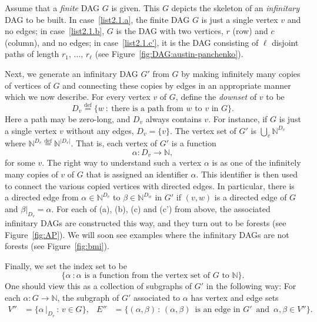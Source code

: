 \documentclass[AHL,Unicode,longabstracts,published]{cedram}
\newcommand{\alf}{\alpha}%
\newcommand*{\defeq}{\stackrel{\mathrm{def}}{=}}
\newcommand*\N{\mathbb{N}}
\newcommand*\N{\mathbb{N}}
\begin{document}
Assume that a \emph{finite} DAG $G$ is given. This $G$ depicts the skeleton of an \emph{infinitary} DAG to be built. In case~\eqref{list2.1.a}, the finite DAG $G$ is just a single vertex $v$ and no edges; in case~\eqref{list2.1.b}, $G$ is the DAG with two vertices, $r$ (row) and $c$ (column), and no edges; in case~\eqref{list2.1.c'}, it is the DAG consisting of $\ell$ disjoint paths of length $r_1,\,\ldots,\,r_\ell$ (see Figure~\ref{fig:DAG:austin-panchenko}).

Next, we generate an infinitary DAG $G'$ from $G$ by making infinitely many copies of vertices of $G$ and connecting these copies by edges in an appropriate manner which we now describe. For every vertex $v$ of $G$, define the \emph{downset} of $v$ to be
\[
D_v
\defeq \{w~:~\text{there is a path from }w \text{ to }v \text{ in }G\}.
\]
Here a path may be zero-long, and $D_v$ always contains $v$. For instance, if $G$ is just a single vertex $v$ without any edges, $D_v = \{v\}$.
The vertex set of $G'$ is $\bigcup_v \N^{D_v}$ where $\N^{D_v}
\defeq\N^{|D_v|}$. That is, each vertex of $G'$ is a function
\[
\alf:D_v\to \N,
\]
for some $v$. The right way to understand such a vertex $\alf$ is as one of the infinitely many copies of $v$ of $G$ that is assigned an identifier $\alpha$. This identifier is then used to connect the various copied vertices with directed edges. In particular, there is a directed edge from $\alpha \in \N^{D_v}$ to $\beta \in \N^{D_w}$ in $G'$ if $(v,w)$ is a directed edge of $G$ and $\beta|_{D_v} = \alpha$. For each of (a), (b), (c) and (c') from above, the associated infinitary DAGs are constructed this way, and they turn out to be forests (see Figure~\ref{fig:AP}). We will soon see examples where the infinitary DAGs are not forests (see Figure~\ref{fig:bmi}).

Finally, we set the index set to be
\[
\{\alf~: \alf \text{ is a function from the vertex set of }G\text{ to }\N\}.
\]
One should view this as a collection of subgraphs of $G'$ in the following way: For each $\alpha : G \to \N$, the subgraph of $G'$ associated to $\alpha$ has vertex and edge sets
\begin{align*}
V'' & = \big\{\alpha\,\big|_{D_v}\,:\,v \in G\big\}, & E'' & = \big\{(\alpha,\beta)\,:\,(\alpha,\beta)\,\text{ is an edge in }G'\,
\text{ and }\,\alpha,\beta \in V'' \big\}.
\end{align*}

\end{document}
